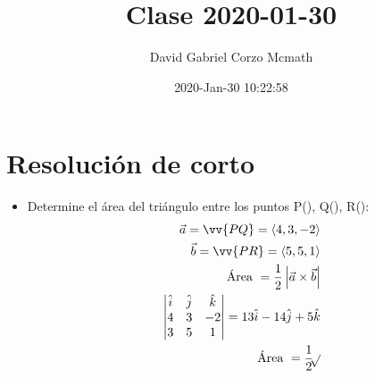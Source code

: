 \documentclass{article}
\title{Clase 2020-01-30}
\author{David Gabriel Corzo Mcmath}
\date{2020-Jan-30 10:22:58}
\begin{document}
\maketitle

\section{Resolución de corto}
\begin{itemize}
    \item Determine el área del triángulo entre los puntos P(), Q(), R():
        \begin{align*}
            \vec{a} = \vv{PQ} = \left\langle 4,3,-2 \right\rangle \\ 
            \vec{b} = \vv{PR} = \left\langle 5,5,1 \right\rangle \\ 
            \text{  Área  } = \frac{1}{2} \left| \vec{a} \times  \vec{b} \right| \\ 
            \begin{vmatrix}
                \hat{i} & \hat{j} & \hat{k} \\ 
                4 & 3 & -2 \\ 
                3 & 5 & 1 \\ 
            \end{vmatrix} = 13 \hat{i} - 14 \hat{j} + 5 \hat{k} \\  
            \text{  Área  } = \frac{1}{2} \sqrt[]{} \\ 
        \end{align*}

\end{itemize}
    



\end{document}
